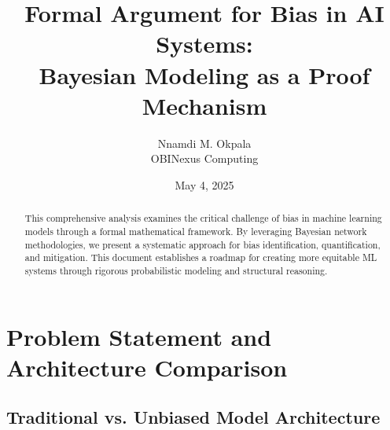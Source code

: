 \documentclass[11pt,a4paper]{article}
\title{Formal Argument for Bias in AI Systems:\\ Bayesian Modeling as a Proof Mechanism}
\author{Nnamdi M. Okpala \\ OBINexus Computing}
\date{May 4, 2025}
\begin{document}
\maketitle

\begin{abstract}
This comprehensive analysis examines the critical challenge of bias in machine learning models through a formal mathematical framework. By leveraging Bayesian network methodologies, we present a systematic approach for bias identification, quantification, and mitigation. This document establishes a roadmap for creating more equitable ML systems through rigorous probabilistic modeling and structural reasoning.
\end{abstract}

\section{Problem Statement and Architecture Comparison}

\subsection{Traditional vs. Unbiased Model Architecture}
\end{document}
